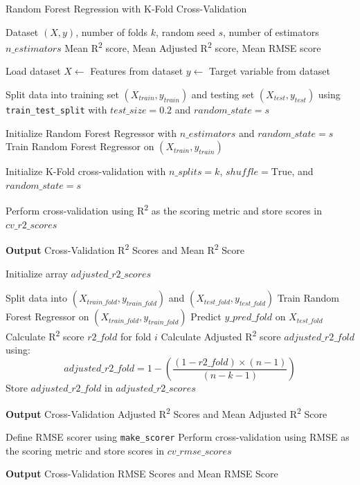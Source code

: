 \documentclass[sn-mathphys]{sn-jnl}%
\theoremstyle{thmstyleone}%
\theoremstyle{thmstyletwo}%
\theoremstyle{thmstylethree}%
\begin{document}
\begin{algorithm}
\caption{Random Forest Regression with K-Fold Cross-Validation}
\label{alg:Alg3}
\begin{algorithmic}[1]
\Require Dataset $(X, y)$, number of folds $k$, random seed $s$, number of estimators $n\_estimators$
\Ensure Mean R\textsuperscript{2} score, Mean Adjusted R\textsuperscript{2} score, Mean RMSE score

\State Load dataset
\State $X \gets$ Features from dataset
\State $y \gets$ Target variable from dataset

\State Split data into training set $(X_{train}, y_{train})$ and testing set $(X_{test}, y_{test})$ using \texttt{train\_test\_split} with $test\_size=0.2$ and $random\_state=s$

\State Initialize Random Forest Regressor with $n\_estimators$ and $random\_state=s$
\State Train Random Forest Regressor on $(X_{train}, y_{train})$

\State Initialize K-Fold cross-validation with $n\_splits=k$, $shuffle=\text{True}$, and $random\_state=s$

\State Perform cross-validation using R\textsuperscript{2} as the scoring metric and store scores in $cv\_r2\_scores$

\State \textbf{Output} Cross-Validation R\textsuperscript{2} Scores and Mean R\textsuperscript{2} Score

\State Initialize array $adjusted\_r2\_scores$

    \State Split data into $(X_{train\_fold}, y_{train\_fold})$ and $(X_{test\_fold}, y_{test\_fold})$
    \State Train Random Forest Regressor on $(X_{train\_fold}, y_{train\_fold})$
    \State Predict $y\_pred\_fold$ on $X_{test\_fold}$
    \State Calculate R\textsuperscript{2} score $r2\_fold$ for fold $i$
    \State Calculate Adjusted R\textsuperscript{2} score $adjusted\_r2\_fold$ using:
    \[
    adjusted\_r2\_fold = 1 - \left(\frac{(1 - r2\_fold) \times (n - 1)}{(n - k - 1)}\right)
    \]
    \State Store $adjusted\_r2\_fold$ in $adjusted\_r2\_scores$
\EndFor

\State \textbf{Output} Cross-Validation Adjusted R\textsuperscript{2} Scores and Mean Adjusted R\textsuperscript{2} Score

\State Define RMSE scorer using \texttt{make\_scorer}
\State Perform cross-validation using RMSE as the scoring metric and store scores in $cv\_rmse\_scores$

\State \textbf{Output} Cross-Validation RMSE Scores and Mean RMSE Score

\end{algorithmic}
\end{algorithm}
\end{document}
